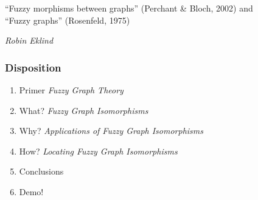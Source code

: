 \documentclass[aspectratio=1610]{beamer}
\begin{document}


\startpage

\begin{frame}
	\vspace{0.02\textheight}

	\begin{Large}
		``Fuzzy morphisms between graphs'' {\small (Perchant \& Bloch, 2002)} and \\ ``Fuzzy graphs'' {\small (Rosenfeld, 1975)}
	\end{Large}

	\vspace{0.1\textheight}

	\begin{small}
		\textit{Robin Eklind}
	\end{small}
\end{frame}


\normalpage

\begin{frame}
	\frametitle{Disposition}

	\begin{enumerate}
		\item Primer \textit{Fuzzy Graph Theory}
		\item What? \textit{Fuzzy Graph Isomorphisms}
		\item Why? \textit{Applications of Fuzzy Graph Isomorphisms}
		\item How? \textit{Locating Fuzzy Graph Isomorphisms}
		\item Conclusions
		\item Demo!
	\end{enumerate}
\end{frame}








\end{document}
